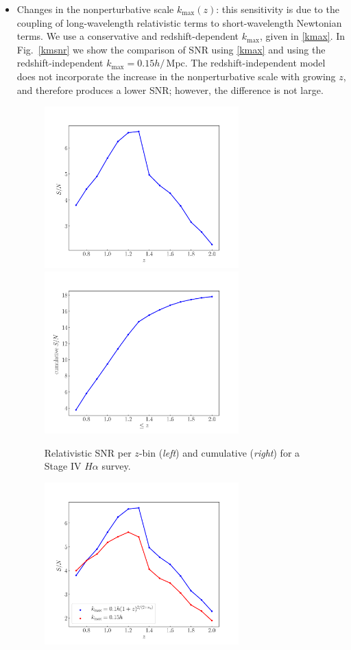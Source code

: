 \begin{itemize}
\item 
Changes in the nonperturbative scale  $k_{\mathrm{max}}(z)$: this sensitivity is due to the coupling of long-wavelength relativistic terms to short-wavelength Newtonian terms. 
We use a conservative and redshift-dependent $k_{\mathrm{max}}$, given in \eqref{kmax}. In  Fig.~\ref{kmsnr}
we show the comparison of SNR using \eqref{kmax} and using the redshift-independent $k_{\mathrm{max}}=0.15h/\,$Mpc. The redshift-independent model does not incorporate  the increase in the nonperturbative scale with growing $z$, and therefore produces a lower SNR; however, the difference is not large.
\begin{figure}[ht]
\centering
\includegraphics[width=7.5cm]{fig/snrDoppler-eps-converted-to}
\includegraphics[width=7.5cm]{fig/CumulativesnrDoppler-eps-converted-to}
\caption{Relativistic SNR per $z$-bin  ({\em left}) and cumulative ({\em right}) for a Stage IV $H\alpha$ survey.} \label{fig4}
\end{figure}
\begin{figure}[ht]
\centering
\includegraphics[width=7.5cm]{fig/kmaxsnr-eps-converted-to}

\end{figure}
\end{itemize}

